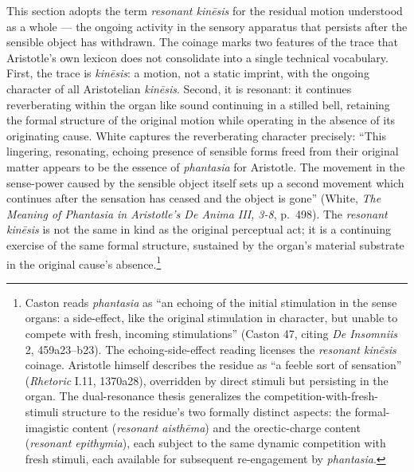 \documentclass{article}
\begin{document}
This section adopts the term \textit{resonant kinēsis} for the residual motion understood as a whole --- the ongoing activity in the sensory apparatus that persists after the sensible object has withdrawn. The coinage marks two features of the trace that Aristotle's own lexicon does not consolidate into a single technical vocabulary. First, the trace is \textit{kinēsis}: a motion, not a static imprint, with the ongoing character of all Aristotelian \textit{kinēsis}. Second, it is resonant: it continues reverberating within the organ like sound continuing in a stilled bell, retaining the formal structure of the original motion while operating in the absence of its originating cause. White captures the reverberating character precisely: ``This lingering, resonating, echoing presence of sensible forms freed from their original matter appears to be the essence of \textit{phantasia} for Aristotle. The movement in the sense-power caused by the sensible object itself sets up a second movement which continues after the sensation has ceased and the object is gone'' (White, \textit{The Meaning of Phantasia in Aristotle's De Anima III, 3-8}, p.~498). The \textit{resonant kinēsis} is not the same in kind as the original perceptual act; it is a continuing exercise of the same formal structure, sustained by the organ's material substrate in the original cause's absence.\footnote{Caston reads \textit{phantasia} as ``an echoing of the initial stimulation in the sense organs: a side-effect, like the original stimulation in character, but unable to compete with fresh, incoming stimulations'' (Caston 47, citing \textit{De Insomniis} 2, 459a23--b23). The echoing-side-effect reading licenses the \textit{resonant kinēsis} coinage. Aristotle himself describes the residue as ``a feeble sort of sensation'' (\textit{Rhetoric} I.11, 1370a28), overridden by direct stimuli but persisting in the organ. The dual-resonance thesis generalizes the competition-with-fresh-stimuli structure to the residue's two formally distinct aspects: the formal-imagistic content (\textit{resonant aisthēma}) and the orectic-charge content (\textit{resonant epithymia}), each subject to the same dynamic competition with fresh stimuli, each available for subsequent re-engagement by \textit{phantasia}.}
\end{document}
